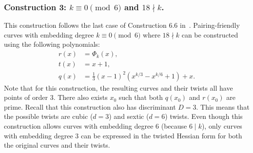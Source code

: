
\subsubsection{Construction 3: $k \equiv 0 \pmod{6}$ and $18 \nmid k$.}
\label{con3}

This construction follows the last case of {Construction 6.6} in~\cite{2010/freeman}.
Pairing-friendly curves with embedding degree $k \equiv 0 \pmod{6}$ where $18 \nmid k$
can be constructed using the following polynomials:
\begin{align*}
r(x) &= \Phi_k(x),	\\
t(x) &= x+1,		\\
q(x) &= \frac{1}{3} (x-1)^2 (x^{k/3} - x^{k/6} + 1) + x.
\end{align*}
Note that for this construction,
the resulting curves and their twists all have points of order 3.
There also exists $x_0$ such that both $q(x_0)$ and $r(x_0)$ are prime.
Recall that this construction also has discriminant $D = 3$.
This means that the possible twists are  cubic ($d=3$) and sextic ($d=6$) twists.
Even though this construction allows curves with embedding degree $6$ (because $6 \mid k$),
only curves with embedding degree $3$ can be expressed in the twisted Hessian form
for both the original curves and their twists.


